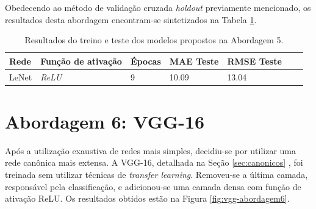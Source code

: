 	Obedecendo ao método de validação cruzada \emph{holdout} previamente mencionado, os resultados desta abordagem encontram-se sintetizados na Tabela \ref{tab:results-5}.

	\begin{table}[!ht]
		\centering
		\caption{Resultados do treino e teste dos modelos propostos na Abordagem 5.}
		\label{tab:results-5}
			\begin{tabular}{l l l l l l l}
				\toprule
				Rede & Função de ativação & Épocas & MAE Teste & RMSE Teste \\
				\midrule
				LeNet & \emph{ReLU} & 9 &  10.09 & 13.04 \\
				\bottomrule
			\end{tabular}
		\end{table}


\section{Abordagem 6: VGG-16}
	Após a utilização exaustiva de redes mais simples, decidiu-se por utilizar uma rede canônica mais extensa. A VGG-16, detalhada na Seção \ref{sec:canonicos} , foi treinada sem utilizar técnicas de \emph{transfer learning}. Removeu-se a última camada, responsável pela classificação, e adicionou-se uma camada densa com função de ativação ReLU. Os resultados obtidos estão na Figura \ref{fig:vgg-abordagem6}.

